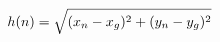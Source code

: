\documentclass[preview]{standalone}
\begin{document}
\begin{align*}
\special{dvisvgm:raw <g id='unique000'>}h(n) = \sqrt{(x_n - x_g)^2 + (y_n - y_g)^2}\special{dvisvgm:raw </g>}
\end{align*}
\end{document}
